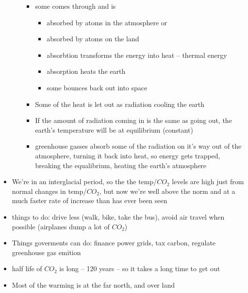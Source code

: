 \documentclass{article}
\theoremstyle{definition}
\begin{document}
\begin{itemize}
\begin{itemize}
\begin{itemize}
					\item some comes through and is
						\begin{itemize}
							\item absorbed by atoms in the atmosphere or
							\item absorbed by atoms on the land 
							\item absorbtion transforms the energy into heat -- thermal energy
							\item absorption heats the earth
							\item some bounces back out into space
						\end{itemize}
					\item Some of the heat is let out as radiation cooling the earth
					\item If the amount of radiation coming in is the same as going out, the earth's temperature will be at equilibrium (constant)
					\item greenhouse gasses absorb some of the radiation on it's way out of the atmosphere, turning it back into heat, so energy gets trapped, breaking the equalibrium, heating the earth's atmosphere
				\end{itemize}
		\end{itemize}
	\item We're in an interglacial period, so the the temp/$CO_2$ levels are high just from normal changes in temp/$CO_2$, but now we're well above the norm and at a much faster rate of increase than has ever been seen
	\item things to do: drive less (walk, bike, take the bus), avoid air travel when possible (airplanes dump a lot of $CO_2$)
	\item Things goverments can do: finance power grids, tax carbon, regulate greenhouse gas emition
	\item half life of $CO_2$ is long -- 120 years -- so it takes a long time to get out
	\item Most of the warming is at the far north, and over land
\end{itemize}


							
\end{document}
